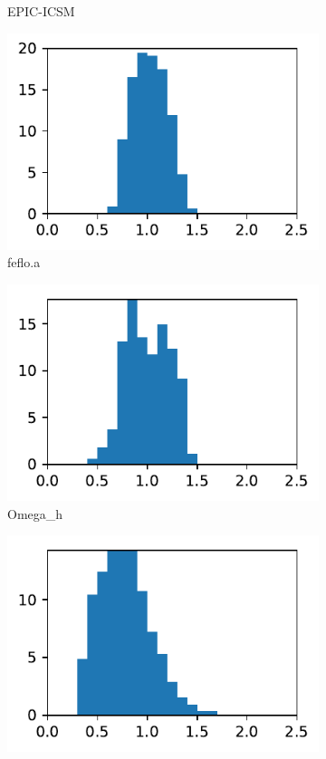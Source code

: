 \documentclass[3p,times,procedia,number]{elsarticle}
\begin{document}
\begin{figure}
\begin{subfigure}{.16\textwidth}
\caption{EPIC-ICSM}
\end{subfigure}
\begin{subfigure}{.16\textwidth}
\centering
\includegraphics[width=\textwidth]{fefloa-cube-linear-length.pdf}
\caption{feflo.a}
\end{subfigure}
\begin{subfigure}{.16\textwidth}
\centering
\includegraphics[width=\textwidth]{omega_h-cube-linear-length.pdf}
\caption{Omega\_h}
\end{subfigure}
\begin{subfigure}{.16\textwidth}
\centering
\includegraphics[width=\textwidth]{refine-one-cube-linear-length.pdf}

\end{subfigure}
\end{figure}
\end{document}
